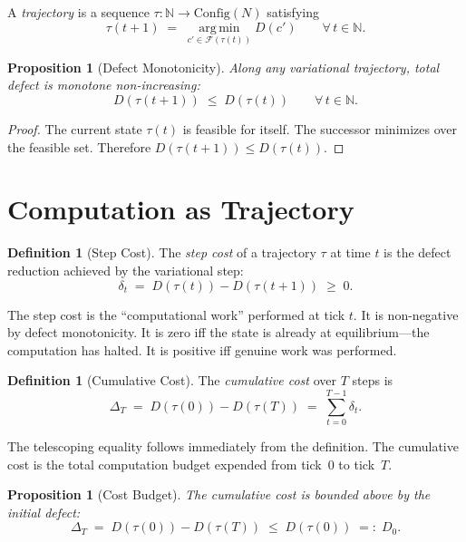 \documentclass[11pt,a4paper]{article}
\theoremstyle{plain}
\newtheorem{proposition}[theorem]{Proposition}
\theoremstyle{definition}
\newtheorem{definition}[theorem]{Definition}
\theoremstyle{remark}
\newcommand{\N}{\mathbb{N}}
\begin{document}
A \emph{trajectory} is a sequence $\tau : \N \to \text{Config}(N)$ satisfying
\[
\tau(t{+}1) \;=\; \operatorname*{arg\,min}_{c' \in \mathcal{F}(\tau(t))} D(c')
\qquad \forall\, t \in \N.
\]

\begin{proposition}[Defect Monotonicity]\label{prop:monotone}
Along any variational trajectory, total defect is monotone non-increasing:
\[
D(\tau(t{+}1)) \;\le\; D(\tau(t)) \qquad \forall\, t \in \N.
\]
\end{proposition}

\begin{proof}
The current state $\tau(t)$ is feasible for itself.
The successor minimizes over the feasible set.
Therefore $D(\tau(t{+}1)) \le D(\tau(t))$.
\end{proof}

\section{Computation as Trajectory}\label{sec:computation}

\begin{definition}[Step Cost]\label{def:stepcost}
The \emph{step cost} of a trajectory $\tau$ at time $t$ is the defect reduction achieved by the variational step:
\[
\delta_t \;=\; D(\tau(t)) - D(\tau(t{+}1)) \;\ge\; 0.
\]
\end{definition}

The step cost is the ``computational work'' performed at tick $t$.
It is non-negative by defect monotonicity.
It is zero iff the state is already at equilibrium---the computation has halted.
It is positive iff genuine work was performed.

\begin{definition}[Cumulative Cost]\label{def:cumcost}
The \emph{cumulative cost} over $T$ steps is
\[
\Delta_T \;=\; D(\tau(0)) - D(\tau(T)) \;=\; \sum_{t=0}^{T-1} \delta_t.
\]
\end{definition}

The telescoping equality follows immediately from the definition.
The cumulative cost is the total computation budget expended from tick~0 to tick~$T$.

\begin{proposition}[Cost Budget]\label{prop:budget}
The cumulative cost is bounded above by the initial defect:
\[
\Delta_T \;=\; D(\tau(0)) - D(\tau(T)) \;\le\; D(\tau(0)) \;=:\; D_0.
\]
\end{proposition}
\end{document}
